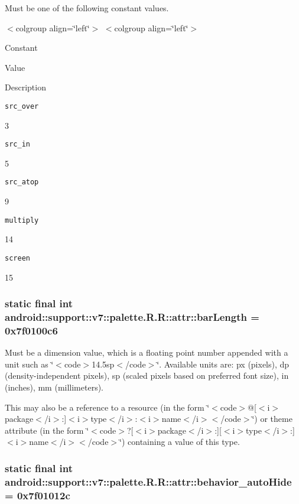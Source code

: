 Must be one of the following constant values. \begin{TabularC}{0}
\hline
\end{TabularC}
$<$colgroup align=\char`\"{}left\char`\"{}$>$ $<$colgroup align=\char`\"{}left\char`\"{}$>$ 

Constant

Value

Description 

{\tt src\_\-over}

3

{\tt src\_\-in}

5

{\tt src\_\-atop}

9

{\tt multiply}

14

{\tt screen}

15\hypertarget{classandroid_1_1support_1_1v7_1_1palette_1_1_r_1_1attr_419293086628a2b872355dc783b04fa0}{
\subsubsection[{barLength}]{\setlength{\rightskip}{0pt plus 5cm}static final int android::support::v7::palette.R.R::attr::barLength = 0x7f0100c6}}
\label{classandroid_1_1support_1_1v7_1_1palette_1_1_r_1_1attr_419293086628a2b872355dc783b04fa0}


Must be a dimension value, which is a floating point number appended with a unit such as \char`\"{}$<$code$>$14.5sp$<$/code$>$\char`\"{}. Available units are: px (pixels), dp (density-independent pixels), sp (scaled pixels based on preferred font size), in (inches), mm (millimeters). 

This may also be a reference to a resource (in the form \char`\"{}$<$code$>$@\mbox{[}$<$i$>$package$<$/i$>$:\mbox{]}$<$i$>$type$<$/i$>$:$<$i$>$name$<$/i$>$$<$/code$>$\char`\"{}) or theme attribute (in the form \char`\"{}$<$code$>$?\mbox{[}$<$i$>$package$<$/i$>$:\mbox{]}\mbox{[}$<$i$>$type$<$/i$>$:\mbox{]}$<$i$>$name$<$/i$>$$<$/code$>$\char`\"{}) containing a value of this type. \hypertarget{classandroid_1_1support_1_1v7_1_1palette_1_1_r_1_1attr_6a6bac97459d1a6d43f2d04fdf52d7a1}{
\subsubsection[{behavior\_\-autoHide}]{\setlength{\rightskip}{0pt plus 5cm}static final int android::support::v7::palette.R.R::attr::behavior\_\-autoHide = 0x7f01012c}}
\label{classandroid_1_1support_1_1v7_1_1palette_1_1_r_1_1attr_6a6bac97459d1a6d43f2d04fdf52d7a1}


